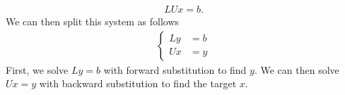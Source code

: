 \documentclass{report}
\begin{document}
\begin{itemize}
            \begin{align*}
                LUx = b
            .\end{align*}
            We can then split this system as follows
            \begin{align*}
                \begin{cases}
                    Ly &= b \\
                    Ux &= y
                \end{cases}
            \end{align*}
            First, we solve $Ly = b$ with forward substitution to find $y$. We can then solve $Ux = y$ with backward substitution to find the target $x$.


    \end{itemize}

    \pagebreak 
    \bigbreak \noindent 
\end{document}
